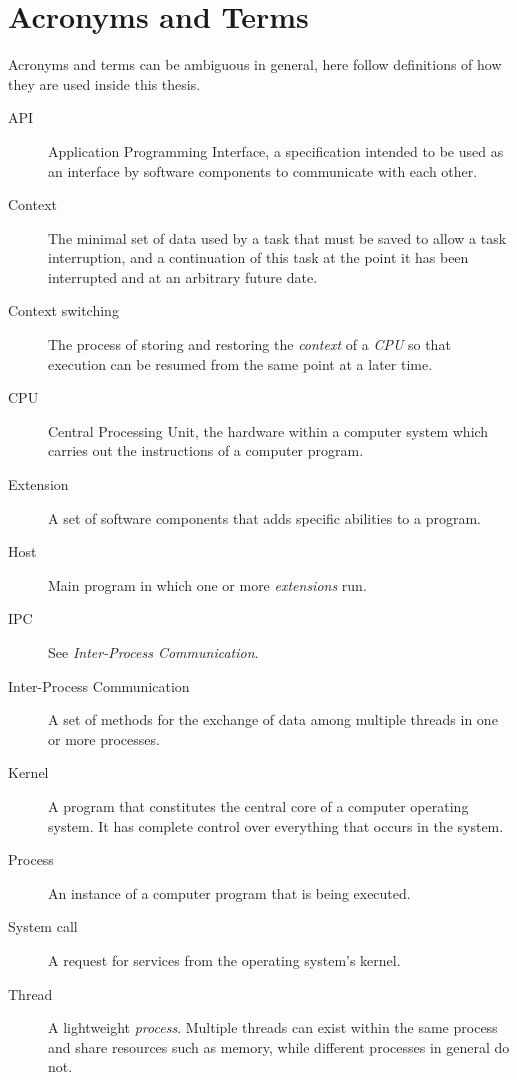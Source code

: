 \chapter{Acronyms and Terms}\label{appA}

Acronyms and terms can be ambiguous in general, here follow definitions of how
they are used inside this thesis.

\begin{description}
	\item[API] Application Programming Interface, a specification intended to
		be used as an interface by software components to communicate with each
		other.
	\item[Context] The minimal set of data used by a task that must be saved
		to allow a task interruption, and a continuation of this task at the
		point it has been interrupted and at an arbitrary future date.
	\item[Context switching] The process of storing and restoring the
		\emph{context} of a \emph{CPU} so that execution can be resumed from
		the same point at a later time.
	\item[CPU] Central Processing Unit, the hardware within a computer system
		which carries out the instructions of a computer program.
	\item[Extension] A set of software components that adds specific abilities
		to a program.
	\item[Host] Main program in which one or more \emph{extensions} run.
	\item[IPC] See \emph{Inter-Process Communication}.
	\item[Inter-Process Communication] A set of methods for the exchange of
		data among multiple threads in one or more processes.
	\item[Kernel]  A program that constitutes the central core of a computer
		operating system. It has complete control over everything that occurs
		in the system. 
	\item[Process] An instance of a computer program that is being executed.
	\item[System call] A request for services from the operating system's
		kernel.
	\item[Thread] A lightweight \emph{process}. Multiple threads can exist
		within the same process and share resources such as memory, while
		different processes in general do not.
\end{description}

